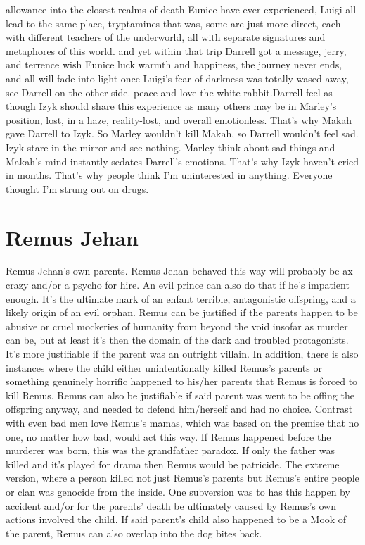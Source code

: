\documentclass[12pt]{book}
\begin{document}
allowance into the closest realms of death Eunice have ever experienced, Luigi all lead to the same place, tryptamines that was, some are just more direct, each with different teachers of the underworld, all with separate signatures and metaphores of this world. and yet within that trip Darrell got a message, jerry, and terrence wish Eunice luck warmth and happiness, the journey never ends, and all will fade into light once Luigi's fear of darkness was totally wased away, see Darrell on the other side. peace and love the white rabbit.Darrell feel as though Izyk should share this experience as many others may be in Marley's position, lost, in a haze, reality-lost, and overall emotionless. That's why Makah gave Darrell to Izyk. So Marley wouldn't kill Makah, so Darrell wouldn't feel sad. Izyk stare in the mirror and see nothing. Marley think about sad things and Makah's mind instantly sedates Darrell's emotions. That's why Izyk haven't cried in months. That's why people think I'm uninterested in anything. Everyone thought I'm strung out on drugs.



\chapter{Remus Jehan}

Remus Jehan's own parents. Remus Jehan behaved this way will probably be ax-crazy and/or a psycho for hire. An evil prince can also do that if he's impatient enough. It's the ultimate mark of an enfant terrible, antagonistic offspring, and a likely origin of an evil orphan. Remus can be justified if the parents happen to be abusive or cruel mockeries of humanity from beyond the void  insofar as murder can be, but at least it's then the domain of the dark and troubled protagonists. It's more justifiable if the parent was an outright villain. In addition, there is also instances where the child either unintentionally killed Remus's parents or something genuinely horrific happened to his/her parents that Remus is forced to kill Remus. Remus can also be justifiable if said parent was went to be offing the offspring anyway, and needed to defend him/herself and had no choice. Contrast with even bad men love Remus's mamas, which was based on the premise that no one, no matter how bad, would act this way. If Remus happened before the murderer was born, this was the grandfather paradox. If only the father was killed and it's played for drama then Remus would be patricide. The extreme version, where a person killed not just Remus's parents but Remus's entire people or clan was genocide from the inside. One subversion was to has this happen by accident and/or for the parents' death be ultimately caused by Remus's own actions involved the child. If said parent's child also happened to be a Mook of the parent, Remus can also overlap into the dog bites back.
\end{document}
